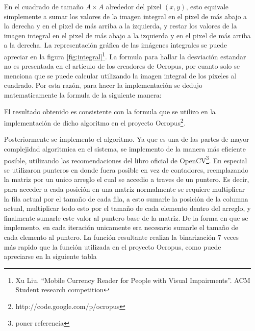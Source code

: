 \documentclass[a4paper, 11pt, oneside]{report}
\begin{document}
En el cuadrado de tamaño $A \times A$ alrededor del pixel $(x, y)$, esto equivale simplemente a sumar los valores de la imagen integral en el pixel de más abajo a la derecha y en el pixel de más arriba a la izquierda, y restar los valores de la imagen integral en el pixel de más abajo a la izquierda y en el pixel de más arriba a la derecha. La representación gráfica de las imágenes integrales se puede apreciar en la figura \ref{fig:integral}\footnote{Xu Liu. ``Mobile Currency Reader for People with Visual Impairments''. ACM Student research competition}. La formula para hallar la desviación estandar no es presentada en el articulo de los creadores de Ocropus, por cuanto solo se menciona que se puede calcular utilizando la imagen integral de los pixeles al cuadrado. Por esta razón, para hacer la implementación se dedujo matematicamente la formula de la siguiente manera:


El resultado obtenido es consistente con la formula que se utilizo en la implementación de dicho algoritmo en el proyecto Ocropus\footnote{http://code.google.com/p/ocropus}.

Posteriormente se implemento el algoritmo. Ya que es una de las partes de mayor complejidad algoritmica en el sistema, se implemento de la manera más eficiente posible, utilizando las recomendaciones del libro oficial de OpenCV\footnote{poner referencia}. En especial se utilizaron punteros en donde fuera posible en vez de contadores, reemplazando la matriz por un unico arreglo el cual se accedio a traves de un puntero. Es decir, para acceder a cada posición en una matriz normalmente se requiere multiplicar la fila actual por el tamaño de cada fila, a esto sumarle la posición de la columna actual, multiplicar todo esto por el tamaño de cada elemento dentro del arreglo, y finalmente sumarle este valor al puntero base de la matriz. De la forma en que se implemento, en cada iteración unicamente era necesario sumarle el tamaño de cada elemento al puntero. La función resultante realiza la binarización 7 veces más rapido que la función utilizada en el proyecto Ocropus, como puede apreciarse en la siguiente tabla %
\end{document}
